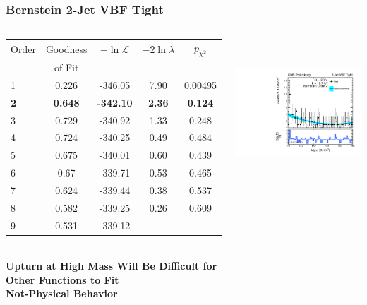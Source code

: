 \documentclass{beamer}
\begin{document}
\begin{frame}
\frametitle{Bernstein 2-Jet VBF Tight}
  \begin{columns}[c]
   \column{60mm}
      \begin{center}
      \tiny
\begin{tabular}{|l|c|c|c|c|} \hline
Order & Goodness & $-\ln\mathcal{L}$ & $-2\ln\lambda$ & $p_{\chi^2}$ \\ 
 & of Fit  &  & &  \\ \hline \hline
1 & 0.226 & -346.05 & 7.90 & 0.00495  \\ \hline
\bf 2 & \bf 0.648 & \bf -342.10 & \bf 2.36 & \bf 0.124  \\ \hline
3 & 0.729 & -340.92 & 1.33 & 0.248  \\ \hline
4 & 0.724 & -340.25 & 0.49 & 0.484  \\ \hline
5 & 0.675 & -340.01 & 0.60 & 0.439  \\ \hline
6 & 0.67 & -339.71 & 0.53 & 0.465  \\ \hline
7 & 0.624 & -339.44 & 0.38 & 0.537  \\ \hline
8 & 0.582 & -339.25 & 0.26 & 0.609  \\ \hline
9 & 0.531 & -339.12 & - & -  \\ \hline
\end{tabular}
\\
\normalsize
\vspace{2em}
\bf
Upturn at High Mass Will Be Difficult for Other Functions to Fit
\\
Not-Physical Behavior
      \end{center}
   \column{60mm}
      \begin{center}
        \includegraphics[height=55mm]{wholeRangeHggStudy1/plotsOrderStudyPolysLowOrders/order_Shape_Jet2CutsVBFPass_Bernstein2}
      \end{center}
  \end{columns}
  \begin{center}
  \end{center}
\end{frame}
\end{document}
